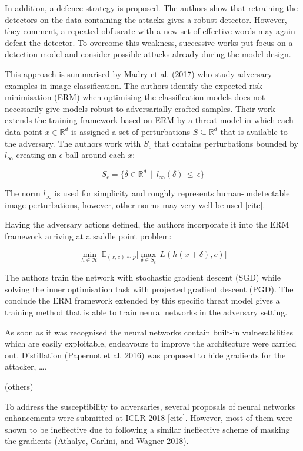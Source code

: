 \documentclass[10pt]{article}
\begin{document}
In addition, a defence strategy is proposed. The authors show that
retraining the detectors on the data containing the attacks gives a
robust detector. However, they comment, a repeated obfuscate with a new set
of effective words may again defeat the detector. To overcome this
weakness, successive works put focus on a detection model and consider
possible attacks already during the model design.

This approach is summarised by Madry et al. (2017) who study adversary
examples in image classification. The authors identify the expected risk
minimisation (ERM) when optimising the classification models does not
necessarily give models robust to adversarially crafted samples. Their
work extends the training framework based on ERM by a threat model in
which each data point \(x \in \mathbb{R}^d\) is assigned a set of
perturbations \(S \subseteq \mathbb{R}^d\) that is available to the
adversary. The authors work with \(S_\epsilon\) that contains
perturbations bounded by \(l_\infty\) creating an \(\epsilon\)-ball
around each \(x\):

\[
S_\epsilon = \{\delta \in \mathbb{R}^d \, \mid \,  l_\infty(\delta) \, \leq \, \epsilon \}
\]

The norm \(l_\infty\) is used for simplicity and roughly represents
human-undetectable image perturbations, however, other norms may very
well be used {[}cite{]}.

Having the adversary actions defined, the authors incorporate it into
the ERM framework arriving at a saddle point problem:

\[
\min_{h \in \mathcal{H}} \, \mathbb{E}_{(x, c) \sim p} \Big[ \max_{\delta \in S_\epsilon} \,  L(h(x + \delta), c) \Big] 
\]

The authors train the network with stochastic gradient descent (SGD)
while solving the inner optimisation task with projected gradient
descent (PGD). The conclude the ERM framework extended by this specific
threat model gives a training method that is able to train neural
networks in the adversary setting.

As soon as it was recognised the neural networks contain built-in
vulnerabilities which are easily exploitable, endeavours to improve the
architecture were carried out. Distillation (Papernot et al. 2016) was
proposed to hide gradients for the attacker, \ldots{}.

(others)

To address the susceptibility to adversaries, several proposals of
neural networks enhancements were submitted at ICLR 2018 {[}cite{]}.
However, most of them were shown to be ineffective due to following a
similar ineffective scheme of masking the gradients (Athalye, Carlini,
and Wagner 2018).
\end{document}
